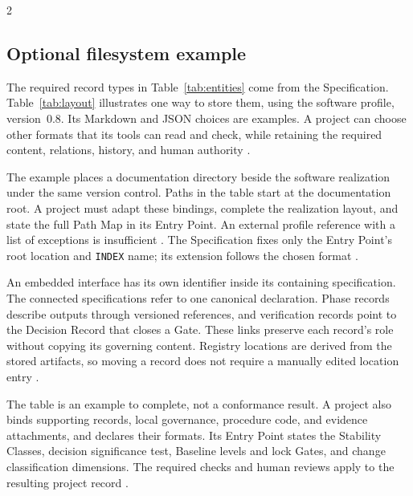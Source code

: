 \begin{multicols}{2}
\subsection{Optional filesystem example}

The required record types in Table~\ref{tab:entities} come from the Specification. Table~\ref{tab:layout} illustrates one way to store them, using the software profile, version~0.8. Its Markdown and JSON choices are examples. A project can choose other formats that its tools can read and check, while retaining the required content, relations, history, and human authority \citep[Sections~\hyperlink{nss-1.8}{1.8} and~\hyperlink{nss-4}{4}]{pss2026}.

The example places a documentation directory beside the software realization under the same version control. Paths in the table start at the documentation root. A project must adapt these bindings, complete the realization layout, and state the full Path Map in its Entry Point. An external profile reference with a list of exceptions is insufficient \citep[Section~\hyperlink{nss-14.8}{14.8}]{pss2026}. The Specification fixes only the Entry Point's root location and \texttt{INDEX} name; its extension follows the chosen format \citep[Section~\hyperlink{nss-14.3}{14.3}]{pss2026}.

An embedded interface has its own identifier inside its containing specification. The connected specifications refer to one canonical declaration. Phase records describe outputs through versioned references, and verification records point to the Decision Record that closes a Gate. These links preserve each record's role without copying its governing content. Registry locations are derived from the stored artifacts, so moving a record does not require a manually edited location entry \citep[Sections~\hyperlink{nss-4.3}{4.3}, \hyperlink{nss-8.4}{8.4}, and~\hyperlink{nss-14.7}{14.7}]{pss2026}.

The table is an example to complete, not a conformance result. A project also binds supporting records, local governance, procedure code, and evidence attachments, and declares their formats. Its Entry Point states the Stability Classes, decision significance test, Baseline levels and lock Gates, and change classification dimensions. The required checks and human reviews apply to the resulting project record \citep[Sections~\hyperlink{nss-14.3}{14.3} and~\hyperlink{nss-16}{16}]{pss2026}.
\end{multicols}

